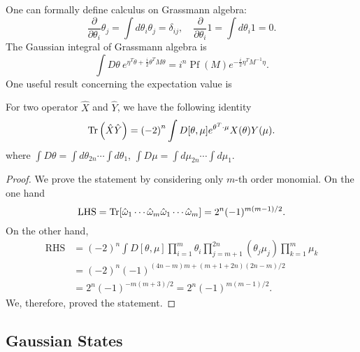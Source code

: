 \documentclass{SciPost}
\begin{document}
One can formally define calculus on Grassmann algebra:
\begin{equation}
	\frac{\partial}{\partial\theta_{i}}\theta_{j} = \int d\theta_{i}\theta_{j}=\delta_{ij},\quad
	\frac{\partial}{\partial\theta_{i}}1 = \int d\theta_{i}1=0.
\end{equation}
The Gaussian integral of Grassmann algebra is
\begin{equation}
	\int D\theta\ e^{\eta^T\theta+\frac{i}{2}\theta^T M\theta}
	=i^n \operatorname{Pf}(M) e^{-\frac{i}{2}\eta^T M^{-1}\eta}.
\end{equation}
One useful result concerning the expectation value is
\begin{theorem}
For two operator $\hat X$ and $\hat Y$, we have the following identity 
$$
\operatorname{Tr}\left(\hat{X}\hat{Y}\right)=\left(-2\right)^{n}\int D[\theta,\mu] e^{\theta^{T}\cdot \mu} X(\theta) Y(\mu).
$$
where $\int D\theta=\int d\theta_{2n}\cdots\int d\theta_{1}$, $\int D\mu =\int d\mu_{2n}\cdots\int d\mu_{1}$.
\end{theorem}
\begin{proof}
We prove the statement by considering only $m$-th order monomial. On the one hand 
$$
\text{LHS}=\operatorname{Tr}[\hat\omega_1 \cdots \hat\omega_m \hat\omega_1 \cdots \hat\omega_m] = 2^{n} (-1)^{m(m-1)/2}.
$$
On the other hand,
\begin{equation*}
\begin{aligned}
	\text{RHS} 
	&= \left(-2\right)^{n} \int D[\theta,\mu] \prod_{i=1}^m\theta_i \prod_{j=m+1}^{2n}(\theta_j\mu_j) \prod_{k=1}^m \mu_k \\
	&= \left(-2\right)^{n} (-1)^{(4n-m)m+(m+1+2n)(2n-m)/2} \\
	&= 2^n(-1)^{-m(m+3)/2} = 2^n(-1)^{m(m-1)/2}.
\end{aligned}
\end{equation*}
We, therefore, proved the statement.
\end{proof}


\subsection{Gaussian States}
\end{document}

